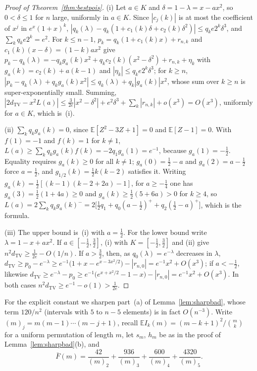 \documentclass[11pt,a4paper]{article}
\theoremstyle{plain}
\theoremstyle{definition}
\theoremstyle{remark}
\begin{document}
\begin{proof}[Proof of Theorem~\ref{thm:bestpois}]
(i) Let $a\in K$ and $\delta=1-\lambda=x-ax^2$, so $0<\delta\le1$ for $n$ large, uniformly in $a\in K$. Since $|c_j(k)|$ is at most the coefficient of $x^j$ in $e^x(1+x)^k$, $|q_k(\lambda)-q_k(1+c_1(k)\delta+c_2(k)\delta^2)|\le q_ke2^k\delta^3$, and $\sum_kq_ke2^k=e^2$. For $k\le n-1$, $p_k=q_k(1+c_1(k)x)+r_{n,k}$ and $c_1(k)(x-\delta)=(1-k)ax^2$ give $p_k-q_k(\lambda)=-q_kg_a(k)x^2+q_kc_2(k)(x^2-\delta^2)+r_{n,k}+\eta_k$ with $g_a(k)=c_2(k)+a(k-1)$ and $|\eta_k|\le q_ke2^k\delta^3$; for $k\ge n$, $|p_k-q_k(\lambda)+q_kg_a(k)x^2|\le q_k(\lambda)+q_k|g_a(k)|x^2$, whose sum over $k\ge n$ is super-exponentially small. Summing, $|2d_{\mathrm{TV}}-x^2L(a)|\le\frac3{2e}|x^2-\delta^2|+e^2\delta^3+\sum_k|r_{n,k}|+o(x^3)=O(x^3)$, uniformly for $a\in K$, which is~(i).

(ii) $\sum_kq_kg_a(k)=0$, since $\mathbb E[Z^2-3Z+1]=0$ and $\mathbb E[Z-1]=0$. With $f(1)=-1$ and $f(k)=1$ for $k\ne1$, $L(a)\ge\sum_kq_kg_a(k)f(k)=-2q_1g_a(1)=e^{-1}$, because $g_a(1)=-\tfrac12$. Equality requires $g_a(k)\ge0$ for all $k\ne1$; $g_a(0)=\tfrac12-a$ and $g_a(2)=a-\tfrac12$ force $a=\tfrac12$, and $g_{1/2}(k)=\tfrac12k(k-2)$ satisfies it. Writing $g_a(k)=\tfrac12[(k-1)(k-2+2a)-1]$, for $a\ge-\tfrac14$ one has $g_a(3)=\tfrac12(1+4a)\ge0$ and $g_a(k)\ge\tfrac12(5+6a)>0$ for $k\ge4$, so $L(a)=2\sum_kq_kg_a(k)^-=2\bigl[\tfrac12q_1+q_0(a-\tfrac12)^++q_2(\tfrac12-a)^+\bigr]$, which is the formula.

(iii) The upper bound is~(i) with $a=\tfrac12$. For the lower bound write $\lambda=1-x+ax^2$. If $a\in[-\tfrac12,\tfrac32]$, (i) with $K=[-\tfrac12,\tfrac32]$ and (ii) give $n^2d_{\mathrm{TV}}\ge\frac1{2e}-O(1/n)$. If $a>\tfrac32$, then, as $q_0(\lambda)=e^{-\lambda}$ decreases in $\lambda$, $d_{\mathrm{TV}}\ge p_0-e^{-\lambda}\ge e^{-1}\bigl(1+x-e^{x-3x^2/2}\bigr)-|r_{n,0}|=e^{-1}x^2+O(x^3)$; if $a<-\tfrac12$, likewise $d_{\mathrm{TV}}\ge e^{-\lambda}-p_0\ge e^{-1}\bigl(e^{x+x^2/2}-1-x\bigr)-|r_{n,0}|=e^{-1}x^2+O(x^3)$. In both cases $n^2d_{\mathrm{TV}}\ge e^{-1}-o(1)>\frac1{2e}$.
\end{proof}

\noindent For the explicit constant we sharpen part~(a) of Lemma~\ref{lem:sharpbad}, whose term $120/n^2$ (intervals with $5$ to $n-5$ elements) is in fact $O(n^{-3})$. Write $(m)_j=m(m-1)\cdots(m-j+1)$, recall $\mathbb EI_k(m)=(m-k+1)^2/\binom mk$ for a uniform permutation of length $m$, let $s_m$, $h_m$ be as in the proof of Lemma~\ref{lem:sharpbad}(b), and
\[
\bar F(m)=\frac{42}{(m)_2}+\frac{936}{(m)_3}+\frac{600}{(m)_4}+\frac{4320}{(m)_5}.
\]
\end{document}
